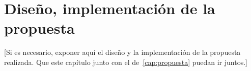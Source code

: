 \chapter{Diseño, implementación de la propuesta}\label{cap:dise-imp}

[Si es necesario, exponer aquí el diseño y la implementación de la propuesta realizada. Que este capítulo junto con el de~\ref{cap:propuesta} puedan ir juntos.]